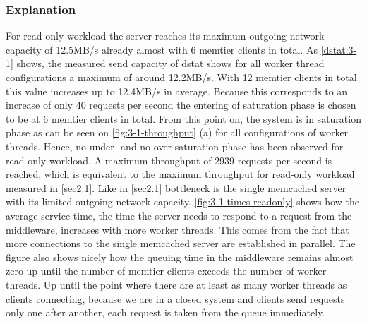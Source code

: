 \documentclass[11pt,a4paper]{article}
\begin{document}
\subsubsection{Explanation}

For read-only workload the server reaches its maximum outgoing network capacity of 12.5MB/s already almost with 6 memtier clients in total. As \autoref{dstat:3-1} shows, the measured send capacity of dstat shows for all worker thread configurations a maximum of around 12.2MB/s. With 12 memtier clients in total this value increases up to 12.4MB/s in average. Because this corresponds to an increase of only 40 requests per second the entering of saturation phase is chosen to be at 6 memtier clients in total. From this point on, the system is in saturation phase as can be seen on \autoref{fig:3-1-throughput} (a) for all configurations of worker threads. Hence, no under- and no over-saturation phase has been observed for read-only workload.
A maximum throughput of 2939 requests per second is reached, which is equivalent to the maximum throughput for read-only workload measured in \autoref{sec2.1}.
Like in \autoref{sec2.1} bottleneck is the single memcached server with its limited outgoing network capacity.
\autoref{fig:3-1-times-readonly} shows how the average service time, the time the server needs to respond to a request from the middleware, increases with more worker threads. This comes from the fact that more connections to the single memcached server are established in parallel. The figure also shows nicely how the queuing time in the middleware remains almost zero up until the number of memtier clients exceeds the number of worker threads. Up until the point where there are at least as many worker threads as clients connecting, because we are in a closed system and clients send requests only one after another, each request is taken from the queue immediately.
\end{document}
